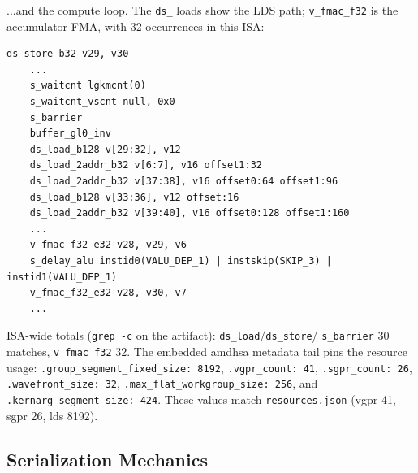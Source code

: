\documentclass[10pt,twoside]{article}
\begin{document}
...and the compute loop. The \texttt{ds\_} loads show the LDS path; \texttt{v\_fmac\_f32} is
the accumulator FMA, with 32 occurrences in this ISA:

\begin{lstlisting}[caption={gfx1101 k-accumulate loop with LDS traffic (\texttt{gemm.isa}).},
                   label={lst:isaloop}]
	ds_store_b32 v29, v30
	...
	s_waitcnt lgkmcnt(0)
	s_waitcnt_vscnt null, 0x0
	s_barrier
	buffer_gl0_inv
	ds_load_b128 v[29:32], v12
	ds_load_2addr_b32 v[6:7], v16 offset1:32
	ds_load_2addr_b32 v[37:38], v16 offset0:64 offset1:96
	ds_load_b128 v[33:36], v12 offset:16
	ds_load_2addr_b32 v[39:40], v16 offset0:128 offset1:160
	...
	v_fmac_f32_e32 v28, v29, v6
	s_delay_alu instid0(VALU_DEP_1) | instskip(SKIP_3) | instid1(VALU_DEP_1)
	v_fmac_f32_e32 v28, v30, v7
	...
\end{lstlisting}

ISA-wide totals (\texttt{grep -c} on the artifact): \texttt{ds\_load}/\texttt{ds\_store}/
\texttt{s\_barrier} 30 matches, \texttt{v\_fmac\_f32} 32. The embedded amdhsa metadata tail
pins the resource usage: \texttt{.group\_segment\_fixed\_size: 8192},
\texttt{.vgpr\_count: 41}, \texttt{.sgpr\_count: 26}, \texttt{.wavefront\_size: 32},
\texttt{.max\_flat\_workgroup\_size: 256}, and \texttt{.kernarg\_segment\_size: 424}. These
values match \texttt{resources.json} (vgpr 41, sgpr 26, lds 8192).

\subsection{Serialization Mechanics}
\label{sec:serialization}
\end{document}
